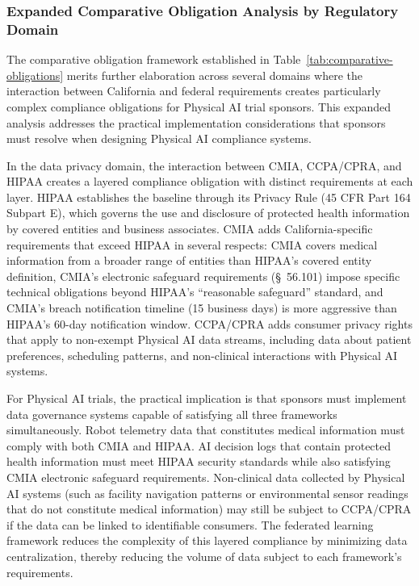 
\subsubsection{Expanded Comparative Obligation Analysis by Regulatory Domain}

The comparative obligation framework established in
Table~\ref{tab:comparative-obligations} merits further elaboration across
several domains where the interaction between California and federal
requirements creates particularly complex compliance obligations for Physical
AI trial sponsors. This expanded analysis addresses the practical
implementation considerations that sponsors must resolve when designing
Physical AI compliance systems.

In the data privacy domain, the interaction between CMIA, CCPA/CPRA, and
HIPAA creates a layered compliance obligation with distinct requirements at
each layer. HIPAA establishes the baseline through its Privacy Rule (45 CFR
Part 164 Subpart E), which governs the use and disclosure of protected health
information by covered entities and business associates. CMIA adds
California-specific requirements that exceed HIPAA in several respects: CMIA
covers medical information from a broader range of entities than HIPAA's
covered entity definition, CMIA's electronic safeguard requirements
(\S~56.101) impose specific technical obligations beyond HIPAA's
``reasonable safeguard'' standard, and CMIA's breach notification timeline
(15 business days) is more aggressive than HIPAA's 60-day notification
window. CCPA/CPRA adds consumer privacy rights that apply to non-exempt
Physical AI data streams, including data about patient preferences,
scheduling patterns, and non-clinical interactions with Physical AI systems.

For Physical AI trials, the practical implication is that sponsors must
implement data governance systems capable of satisfying all three frameworks
simultaneously. Robot telemetry data that constitutes medical information
must comply with both CMIA and HIPAA. AI decision logs that contain protected
health information must meet HIPAA security standards while also satisfying
CMIA electronic safeguard requirements. Non-clinical data collected by
Physical AI systems (such as facility navigation patterns or environmental
sensor readings that do not constitute medical information) may still be
subject to CCPA/CPRA if the data can be linked to identifiable consumers.
The federated learning framework \cite{fl-paper} reduces the complexity of
this layered compliance by minimizing data centralization, thereby reducing
the volume of data subject to each framework's requirements.

